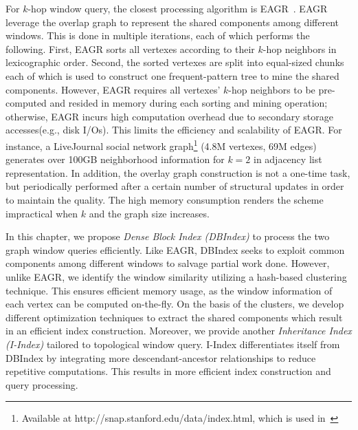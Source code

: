 For $k$-hop window query, the closest processing algorithm is EAGR~\cite{mondal2014eagr}.
%
EAGR leverage the overlap graph to represent the shared
components among different windows.
This is done in multiple iterations, each of which performs the following.
First, EAGR sorts all vertexes according to their $k$-hop 
neighbors in lexicographic order. 
Second, the sorted vertexes are split into equal-sized chunks 
each of which is used to construct one frequent-pattern tree 
to mine the shared components. 
However, EAGR requires all vertexes' $k$-hop 
neighbors to be pre-computed and resided in memory during 
each sorting and mining operation;
otherwise, EAGR incurs high computation overhead due to secondary storage accesses(e.g., disk I/Os).
This limits the efficiency and scalability of EAGR.
For instance, a LiveJournal social network graph\footnote{Available at http://snap.stanford.edu/data/index.html, which is used in~\cite{mondal2014eagr}} 
(4.8M vertexes, 69M edges) generates over 100GB neighborhood information 
for $k=2$ in adjacency list representation. 
In addition, the overlay graph construction is not a one-time task,
but periodically performed after a certain number of structural updates 
in order to maintain the quality. 
The high memory consumption renders the scheme impractical when $k$ and the graph size increases.

In this chapter,
we propose \emph{Dense Block Index (DBIndex)} 
to process the two graph window queries efficiently.
Like EAGR, DBIndex seeks to exploit common
components among different windows to salvage 
partial work done. However, unlike EAGR,
we identify the window similarity utilizing a hash-based 
clustering technique. This ensures 
efficient memory usage, as the window information of each vertex can 
be computed on-the-fly. On the basis of the clusters, we develop different 
optimization techniques to extract the shared components
which result in an efficient index construction. 
%
Moreover, we provide another \emph{Inheritance Index (I-Index)} tailored 
to topological window query. I-Index differentiates itself from
DBIndex by integrating more descendant-ancestor relationships 
to reduce repetitive computations. This results in 
more efficient index construction and query processing.  

